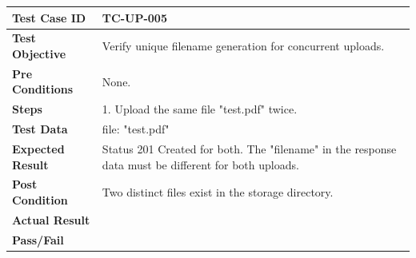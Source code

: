 \begin{longtable}{|p{}|p{}|}
\hline
\textbf{Test Case ID} & TC-UP-005 \\ \hline
\textbf{Test Objective} & Verify unique filename generation for concurrent uploads. \\ \hline
\textbf{Pre Conditions} & None. \\ \hline
\textbf{Steps} & 
1. Upload the same file "test.pdf" twice. \\ \hline
\textbf{Test Data} & file: "test.pdf" \\ \hline
\textbf{Expected Result} & Status 201 Created for both. The "filename" in the response data must be different for both uploads. \\ \hline
\textbf{Post Condition} & Two distinct files exist in the storage directory. \\ \hline
\textbf{Actual Result} &  \\ \hline
\textbf{Pass/Fail} &  \\ \hline
\end{longtable}